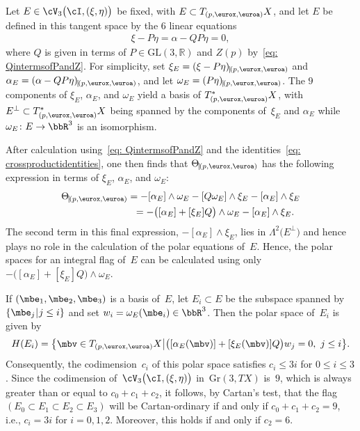 Let $E\in\cV_3\bigl(\cI,(\xi,\eta)\bigr)$ be fixed, with $E\subset T_{(p,\eurox,\euroa)}X$, and let $E$ be defined in this tangent space by the $6$ linear equations
\begin{gather}\label{eq: E in PQterms}
\xi - P \eta = \alpha - QP \eta = 0,
\end{gather}
where $Q$ is given in terms of $P\in\mathrm{GL}(3,\mathbb{R})$ and $Z(p)$ by~\eqref{eq: QintermsofPandZ}. For simplicity, set $\xi_E = (\xi - P \eta)_{\vrule(p,\eurox,\euroa)}$
and $\alpha_E = (\alpha - QP \eta)_{\vrule(p,\eurox,\euroa)}$, and let $\omega_E = (P \eta)_{\vrule(p,\eurox,\euroa)}$. The $9$ components of $\xi_E$, $\alpha_E$, and $\omega_E$ yield a basis of $T^*_{(p,\eurox,\euroa)}X$, with $E^\perp\subset T^*_{(p,\eurox,\euroa)}X$ being spanned by the components of~$\xi_E$ and $\alpha_E$ while $\omega_E\colon E\to\bbR^3$ is an isomorphism.

After calculation using~\eqref{eq: QintermsofPandZ} and the identities~\eqref{eq: crossproductidentities}, one then finds that $\Theta_{\vrule(p,\eurox,\euroa)}$ has the following expression in terms of $\xi_E$, $\alpha_E$, and $\omega_E$:
\begin{gather*}
\Theta_{\vrule(p,\eurox,\euroa)} = - [\alpha_E ]\wedge \omega_E
- [Q \omega_E ]\wedge \xi_E - [\alpha_E ]\wedge \xi_E\\
\hphantom{\Theta_{\vrule(p,\eurox,\euroa)}}{} =-\bigl( [\alpha_E ]+ [\xi_E ]Q\big)\wedge\omega_E
 - \left[\alpha_E\right]\wedge \xi_E .
\end{gather*}
The second term in this final expression, $- [\alpha_E ]\wedge \xi_E$, lies in $\Lambda^2\big(E^\perp\big)$ and hence plays no role in the calculation of the polar equations of~$E$. Hence, the polar spaces for an integral flag of~$E$ can be calculated using only $-\bigl( [\alpha_E ]+ [\xi_E ]Q\big)\wedge\omega_E$.

If $(\mbe_1,\mbe_2,\mbe_3)$ is a basis of~$E$, let $E_i\subset E$ be the subspace spanned by $\{ \mbe_j\, \vrule \, j\le i \}$ and set $w_i = \omega_E(\mbe_i)\in\bbR^3$.
Then the polar space of~$E_i$ is given by
\begin{gather*}
H(E_i) = \big\{\mbv\in T_{(p,\eurox,\euroa)}X\, \vrule\, \big( [\alpha_E(\mbv) ]+ [\xi_E(\mbv) ]Q\big)w_j =0, \ j\le i\big\}.
\end{gather*}
Consequently, the codimension~$c_i$ of this polar space
satisfies $c_i \le 3i$ for $0\le i\le 3$. Since the codimension
of~$\cV_3\bigl(\cI,(\xi,\eta)\bigr)$ in~$\mathrm{Gr}(3,TX)$ is~$9$,
which is always greater than or equal to $c_0 + c_1 + c_2$,
it follows, by Cartan's test, that the flag
$(E_0\subset E_1\subset E_2\subset E_3)$
will be Cartan-ordinary if and only if $c_0+c_1+c_2=9$,
i.e., $c_i = 3i$ for $i = 0,1,2$.
Moreover, this holds if and only if $c_2 = 6$.

